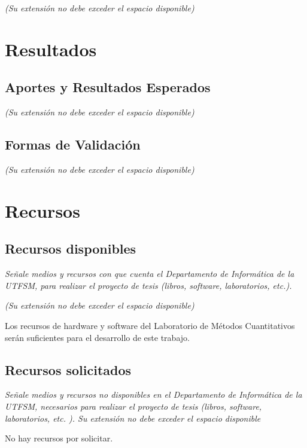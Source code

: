 \documentclass[11pt,spanish]{article}
\begin{document}
\emph{(Su extensión no debe exceder el espacio disponible)}

 
\section{Resultados}

\subsection{Aportes y Resultados Esperados}

\emph{(Su extensión no debe exceder el espacio disponible)}
 

\subsection{Formas de Validación}

\emph{(Su extensión no debe exceder el espacio disponible)}
 

\section{Recursos}

\subsection{Recursos disponibles}

\emph{Señale medios y recursos con que cuenta el Departamento de Informática de
la UTFSM, para realizar el proyecto de tesis (libros, software, laboratorios,
etc.).}

\emph{(Su extensión no debe exceder el espacio disponible) }

Los recursos de hardware y software del Laboratorio de Métodos Cuantitativos
serán suficientes para el desarrollo de este trabajo.

\subsection{Recursos solicitados}

\emph{Señale medios y recursos no disponibles en el Departamento de Informática
de la UTFSM, necesarios para realizar el proyecto de tesis (libros, software,
laboratorios, etc. ). Su extensión no debe exceder el espacio disponible}

No hay recursos por solicitar.
\end{document}
